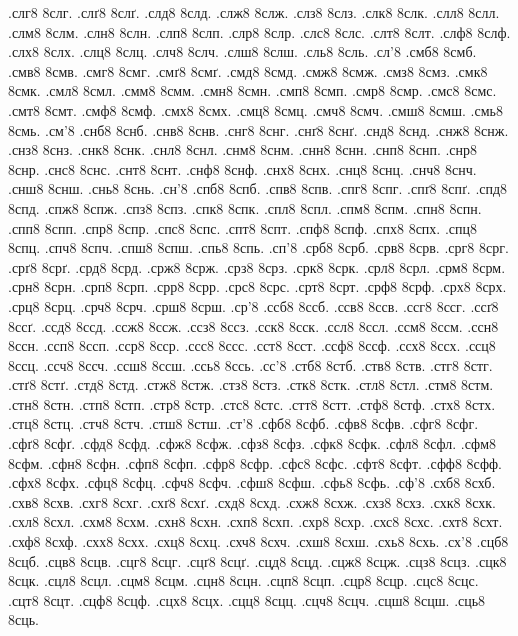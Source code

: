 {.слг8
8слг.
.слґ8
8слґ.
.слд8
8слд.
.слж8
8слж.
.слз8
8слз.
.слк8
8слк.
.слл8
8слл.
.слм8
8слм.
.слн8
8слн.
.слп8
8слп.
.слр8
8слр.
.слс8
8слс.
.слт8
8слт.
.слф8
8слф.
.слх8
8слх.
.слц8
8слц.
.слч8
8слч.
.слш8
8слш.
.сль8
8сль.
.сл'8
.смб8
8смб.
.смв8
8смв.
.смг8
8смг.
.смґ8
8смґ.
.смд8
8смд.
.смж8
8смж.
.смз8
8смз.
.смк8
8смк.
.смл8
8смл.
.смм8
8смм.
.смн8
8смн.
.смп8
8смп.
.смр8
8смр.
.смс8
8смс.
.смт8
8смт.
.смф8
8смф.
.смх8
8смх.
.смц8
8смц.
.смч8
8смч.
.смш8
8смш.
.смь8
8смь.
.см'8
.снб8
8снб.
.снв8
8снв.
.снг8
8снг.
.снґ8
8снґ.
.снд8
8снд.
.снж8
8снж.
.снз8
8снз.
.снк8
8снк.
.снл8
8снл.
.снм8
8снм.
.снн8
8снн.
.снп8
8снп.
.снр8
8снр.
.снс8
8снс.
.снт8
8снт.
.снф8
8снф.
.снх8
8снх.
.снц8
8снц.
.снч8
8снч.
.снш8
8снш.
.снь8
8снь.
.сн'8
.спб8
8спб.
.спв8
8спв.
.спг8
8спг.
.спґ8
8спґ.
.спд8
8спд.
.спж8
8спж.
.спз8
8спз.
.спк8
8спк.
.спл8
8спл.
.спм8
8спм.
.спн8
8спн.
.спп8
8спп.
.спр8
8спр.
.спс8
8спс.
.спт8
8спт.
.спф8
8спф.
.спх8
8спх.
.спц8
8спц.
.спч8
8спч.
.спш8
8спш.
.спь8
8спь.
.сп'8
.срб8
8срб.
.срв8
8срв.
.срг8
8срг.
.срґ8
8срґ.
.срд8
8срд.
.срж8
8срж.
.срз8
8срз.
.срк8
8срк.
.срл8
8срл.
.срм8
8срм.
.срн8
8срн.
.срп8
8срп.
.срр8
8срр.
.срс8
8срс.
.срт8
8срт.
.срф8
8срф.
.срх8
8срх.
.срц8
8срц.
.срч8
8срч.
.срш8
8срш.
.ср'8
.ссб8
8ссб.
.ссв8
8ссв.
.ссг8
8ссг.
.ссґ8
8ссґ.
.ссд8
8ссд.
.ссж8
8ссж.
.ссз8
8ссз.
.сск8
8сск.
.ссл8
8ссл.
.ссм8
8ссм.
.ссн8
8ссн.
.ссп8
8ссп.
.сср8
8сср.
.ссс8
8ссс.
.сст8
8сст.
.ссф8
8ссф.
.ссх8
8ссх.
.ссц8
8ссц.
.ссч8
8ссч.
.ссш8
8ссш.
.ссь8
8ссь.
.сс'8
.стб8
8стб.
.ств8
8ств.
.стг8
8стг.
.стґ8
8стґ.
.стд8
8стд.
.стж8
8стж.
.стз8
8стз.
.стк8
8стк.
.стл8
8стл.
.стм8
8стм.
.стн8
8стн.
.стп8
8стп.
.стр8
8стр.
.стс8
8стс.
.стт8
8стт.
.стф8
8стф.
.стх8
8стх.
.стц8
8стц.
.стч8
8стч.
.стш8
8стш.
.ст'8
.сфб8
8сфб.
.сфв8
8сфв.
.сфг8
8сфг.
.сфґ8
8сфґ.
.сфд8
8сфд.
.сфж8
8сфж.
.сфз8
8сфз.
.сфк8
8сфк.
.сфл8
8сфл.
.сфм8
8сфм.
.сфн8
8сфн.
.сфп8
8сфп.
.сфр8
8сфр.
.сфс8
8сфс.
.сфт8
8сфт.
.сфф8
8сфф.
.сфх8
8сфх.
.сфц8
8сфц.
.сфч8
8сфч.
.сфш8
8сфш.
.сфь8
8сфь.
.сф'8
.схб8
8схб.
.схв8
8схв.
.схг8
8схг.
.схґ8
8схґ.
.схд8
8схд.
.схж8
8схж.
.схз8
8схз.
.схк8
8схк.
.схл8
8схл.
.схм8
8схм.
.схн8
8схн.
.схп8
8схп.
.схр8
8схр.
.схс8
8схс.
.схт8
8схт.
.схф8
8схф.
.схх8
8схх.
.схц8
8схц.
.схч8
8схч.
.схш8
8схш.
.схь8
8схь.
.сх'8
.сцб8
8сцб.
.сцв8
8сцв.
.сцг8
8сцг.
.сцґ8
8сцґ.
.сцд8
8сцд.
.сцж8
8сцж.
.сцз8
8сцз.
.сцк8
8сцк.
.сцл8
8сцл.
.сцм8
8сцм.
.сцн8
8сцн.
.сцп8
8сцп.
.сцр8
8сцр.
.сцс8
8сцс.
.сцт8
8сцт.
.сцф8
8сцф.
.сцх8
8сцх.
.сцц8
8сцц.
.сцч8
8сцч.
.сцш8
8сцш.
.сць8
8сць.
}
